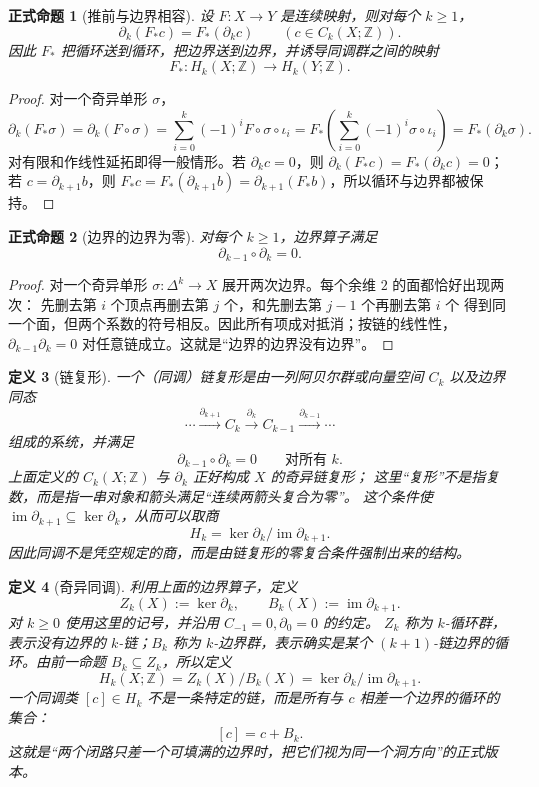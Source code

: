 \documentclass[UTF8,fontset=none,a4paper,11pt]{ctexart}
\theoremstyle{foundation-definition}
\newtheorem{definition}{定义}[section]
\theoremstyle{foundation-theorem}
\theoremstyle{foundation-proposition}
\newtheorem{proposition}[definition]{正式命题}
\theoremstyle{foundation-example}
\theoremstyle{foundation-remark}
\theoremstyle{foundation-theorem}
\begin{document}
\begin{proposition}[推前与边界相容]\label{prop:boundary-pushforward}
设 \(F:X\to Y\) 是连续映射，则对每个 \(k\geq1\)，
\[
\partial_k(F_*c)=F_*(\partial_kc)
\qquad(c\in C_k(X;\mathbb Z)).
\]
因此 \(F_*\) 把循环送到循环，把边界送到边界，并诱导同调群之间的映射
\[
F_*:H_k(X;\mathbb Z)\longrightarrow H_k(Y;\mathbb Z).
\]
\end{proposition}

\begin{proof}
对一个奇异单形 \(\sigma\)，
\[
\partial_k(F_*\sigma)
=\partial_k(F\circ\sigma)
=\sum_{i=0}^k(-1)^iF\circ\sigma\circ\iota_i
=F_*\left(\sum_{i=0}^k(-1)^i\sigma\circ\iota_i\right)
=F_*(\partial_k\sigma).
\]
对有限和作线性延拓即得一般情形。若 \(\partial_kc=0\)，则
\(\partial_k(F_*c)=F_*(\partial_kc)=0\)；若 \(c=\partial_{k+1}b\)，则
\(F_*c=F_*(\partial_{k+1}b)=\partial_{k+1}(F_*b)\)，所以循环与边界都被保持。
\end{proof}

\begin{proposition}[边界的边界为零]\label{prop:boundary-square-zero}
对每个 \(k\geq1\)，边界算子满足
\[
\partial_{k-1}\circ\partial_k=0.
\]
\end{proposition}

\begin{proof}
对一个奇异单形 \(\sigma:\Delta^k\to X\) 展开两次边界。每个余维 \(2\) 的面都恰好出现两次：
先删去第 \(i\) 个顶点再删去第 \(j\) 个，和先删去第 \(j-1\) 个再删去第 \(i\) 个
得到同一个面，但两个系数的符号相反。因此所有项成对抵消；按链的线性性，
\(\partial_{k-1}\partial_k=0\) 对任意链成立。这就是“边界的边界没有边界”。
\end{proof}

\begin{definition}[链复形]\label{def:chain-complex}
一个（同调）链复形是由一列阿贝尔群或向量空间 \(C_k\) 以及边界同态
\[
\cdots\xrightarrow{\partial_{k+1}}C_k
\xrightarrow{\partial_k}C_{k-1}
\xrightarrow{\partial_{k-1}}\cdots
\]
组成的系统，并满足
\[
\partial_{k-1}\circ\partial_k=0
\qquad\text{对所有 }k.
\]
上面定义的 \(C_k(X;\mathbb Z)\) 与 \(\partial_k\) 正好构成 \(X\) 的奇异链复形；
这里“复形”不是指复数，而是指一串对象和箭头满足“连续两箭头复合为零”。
这个条件使 \(\operatorname{im}\partial_{k+1}\subseteq\ker\partial_k\)，从而可以取商
\[
H_k=\ker\partial_k/\operatorname{im}\partial_{k+1}.
\]
因此同调不是凭空规定的商，而是由链复形的零复合条件强制出来的结构。
\end{definition}

\begin{definition}[奇异同调]\label{def:homology}
利用上面的边界算子，定义
\[
Z_k(X):=\ker\partial_k,\qquad
B_k(X):=\operatorname{im}\partial_{k+1}.
\]
对 \(k\geq0\) 使用这里的记号，并沿用 \(C_{-1}=0,\partial_0=0\) 的约定。
\(Z_k\) 称为 \(k\)-循环群，表示没有边界的 \(k\)-链；\(B_k\) 称为 \(k\)-边界群，表示确实是某个
\((k+1)\)-链边界的循环。由前一命题 \(B_k\subseteq Z_k\)，所以定义
\[
H_k(X;\mathbb Z)=Z_k(X)/B_k(X)=\ker\partial_k/\operatorname{im}\partial_{k+1}.
\]
一个同调类 \([c]\in H_k\) 不是一条特定的链，而是所有与 \(c\) 相差一个边界的循环的集合：
\[
[c]=c+B_k.
\]
这就是“两个闭路只差一个可填满的边界时，把它们视为同一个洞方向”的正式版本。
\end{definition}
\end{document}
